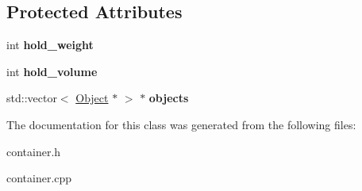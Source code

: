 \subsection*{Protected Attributes}
\begin{DoxyCompactItemize}
\item 
\hypertarget{classda__game_1_1Container_ae00fef93faf3dd5a8535845d0e7f63a0}{
int {\bfseries hold\_\-weight}}
\label{classda__game_1_1Container_ae00fef93faf3dd5a8535845d0e7f63a0}

\item 
\hypertarget{classda__game_1_1Container_aae21247d0254a4e272065b6141795514}{
int {\bfseries hold\_\-volume}}
\label{classda__game_1_1Container_aae21247d0254a4e272065b6141795514}

\item 
\hypertarget{classda__game_1_1Container_ac06cad31bb04667d3fb88c2311422373}{
std::vector$<$ \hyperlink{classda__game_1_1Object}{Object} $\ast$ $>$ $\ast$ {\bfseries objects}}
\label{classda__game_1_1Container_ac06cad31bb04667d3fb88c2311422373}

\end{DoxyCompactItemize}


The documentation for this class was generated from the following files:\begin{DoxyCompactItemize}
\item 
container.h\item 
container.cpp\end{DoxyCompactItemize}
